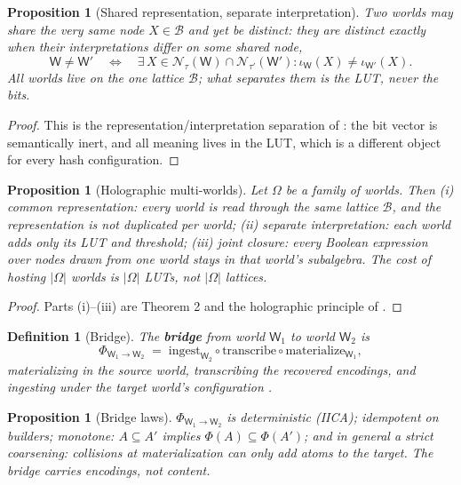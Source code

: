 \documentclass[11pt,a4paper]{article}
\newtheorem{definition}[principle]{Definition}
\newtheorem{proposition}[principle]{Proposition}
\theoremstyle{remark}
\newcommand{\Lat}{\ensuremath{\mathcal{B}}}              %
\newcommand{\World}{\ensuremath{\mathsf{W}}}             %
\newcommand{\Iota}{\ensuremath{\iota}}                   %
\newcommand{\Bridge}{\ensuremath{\Phi}}                  %
\newcommand{\Wset}{\ensuremath{\Omega}}                  %
\begin{document}
\begin{proposition}[Shared representation, separate interpretation]
\label{prop:sharing}
Two worlds may share the very same node $X \in \Lat$ and yet be distinct:
they are distinct exactly when their interpretations differ on some shared
node,
\[
  \World \neq \World'
  \quad\Longleftrightarrow\quad
  \exists\, X \in \mathcal{N}_\tau(\World)\cap\mathcal{N}_{\tau'}(\World'):
  \Iota_\World(X) \neq \Iota_{\World'}(X) .
\]
All worlds live on the one lattice $\Lat$; what separates them is the LUT,
never the bits.
\end{proposition}

\begin{proof}
This is the representation/interpretation separation of \cite{companion2026}:
the bit vector is semantically inert, and all meaning lives in the LUT, which
is a different object for every hash configuration.
\end{proof}

\begin{proposition}[Holographic multi-worlds]
\label{prop:holographic}
Let $\Wset$ be a family of worlds. Then (i) \emph{common representation:}
every world is read through the same lattice $\Lat$, and the representation
is not duplicated per world; (ii) \emph{separate interpretation:} each world
adds only its LUT and threshold; (iii) \emph{joint closure:} every Boolean
expression over nodes drawn from one world stays in that world's subalgebra.
The cost of hosting $|\Wset|$ worlds is $|\Wset|$ LUTs, not $|\Wset|$
lattices.
\end{proposition}

\begin{proof}
Parts (i)--(iii) are Theorem 2 and the holographic principle of
\cite{companion2026}.
\end{proof}

\begin{definition}[Bridge]
\label{def:bridge}
The \textbf{bridge} from world $\World_1$ to world $\World_2$ is
\[
  \Bridge_{\World_1 \to \World_2}
  \;=\;
  \text{ingest}_{\World_2} \circ \text{transcribe} \circ
  \text{materialize}_{\World_1},
\]
materializing in the source world, transcribing the recovered encodings, and
ingesting under the target world's configuration
\cite{companion2026}.
\end{definition}

\begin{proposition}[Bridge laws]
\label{prop:bridge-laws}
$\Bridge_{\World_1\to\World_2}$ is deterministic (IICA); idempotent on
builders; monotone: $A \subseteq A'$ implies
$\Bridge(A) \subseteq \Bridge(A')$; and in general a strict coarsening:
collisions at materialization can only add atoms to the target. The bridge
carries encodings, not content.
\end{proposition}
\end{document}
